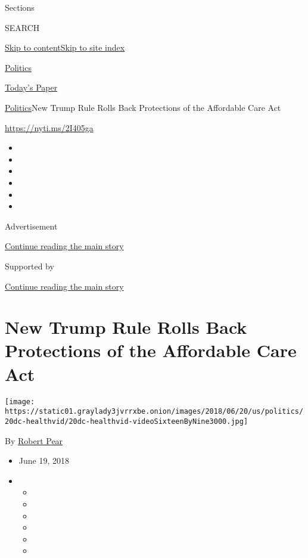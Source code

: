 Sections

SEARCH

\protect\hyperlink{site-content}{Skip to
content}\protect\hyperlink{site-index}{Skip to site index}

\href{https://www.nytimes3xbfgragh.onion/section/politics}{Politics}

\href{https://myaccount.nytimes3xbfgragh.onion/auth/login?response_type=cookie\&client_id=vi}{}

\href{https://www.nytimes3xbfgragh.onion/section/todayspaper}{Today's
Paper}

\href{/section/politics}{Politics}\textbar{}New Trump Rule Rolls Back
Protections of the Affordable Care Act

\url{https://nyti.ms/2I405ga}

\begin{itemize}
\item
\item
\item
\item
\item
\item
\end{itemize}

Advertisement

\protect\hyperlink{after-top}{Continue reading the main story}

Supported by

\protect\hyperlink{after-sponsor}{Continue reading the main story}

\hypertarget{new-trump-rule-rolls-back-protections-of-the-affordable-care-act}{%
\section{New Trump Rule Rolls Back Protections of the Affordable Care
Act}\label{new-trump-rule-rolls-back-protections-of-the-affordable-care-act}}

\texttt{[image: https://static01.graylady3jvrrxbe.onion/images/2018/06/20/us/politics/20dc-healthvid/20dc-healthvid-videoSixteenByNine3000.jpg]}

By \href{https://www.nytimes3xbfgragh.onion/by/robert-pear}{Robert Pear}

\begin{itemize}
\item
  June 19, 2018
\item
  \begin{itemize}
  \item
  \item
  \item
  \item
  \item
  \item
  \end{itemize}
\end{itemize}

